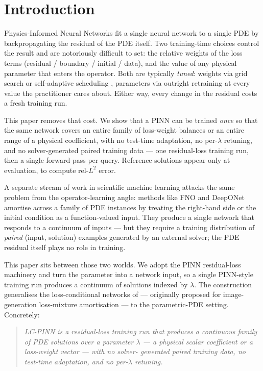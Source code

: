 \section{Introduction}
\label{sec:intro}

Physics-Informed Neural Networks \citep[PINNs;][]{raissi2019} fit a
single neural network to a single PDE by backpropagating the residual
of the PDE itself. Two training-time choices control the result and
are notoriously difficult to set: the relative weights of the loss
terms (residual / boundary / initial / data), and the value of any
physical parameter that enters the operator. Both are typically
\emph{tuned}: weights via grid search or self-adaptive scheduling
\citep{mcclenny2020,bischof2021,wang2024}, parameters via outright
retraining at every value the practitioner cares about. Either way, every
change in the residual costs a fresh training run.

This paper removes that cost. We show that a PINN can be trained
\emph{once} so that the same network covers an entire family of
loss-weight balances or an entire range of a physical coefficient,
with no test-time adaptation, no per-$\lambda$ retuning, and no
solver-generated paired training data --- one residual-loss training
run, then a single forward pass per query. Reference solutions
appear only at evaluation, to compute rel-$L^2$ error.

A separate stream of work in scientific machine learning attacks the
same problem from the operator-learning angle: methods like FNO
\citep{li2020fno} and DeepONet \citep{lu2021deeponet} amortise across
a family of PDE instances by treating the right-hand side or the
initial condition as a function-valued input. They produce a single
network that responds to a continuum of inputs --- but they require a
training distribution of \emph{paired} (input, solution) examples
generated by an external solver; the PDE residual itself plays no
role in training.

This paper sits between those two worlds. We adopt the PINN
residual-loss machinery and turn the parameter into a network input,
so a single PINN-style training run produces a continuum of
solutions indexed by $\lambda$. The construction generalises the
loss-conditional networks of \citet{dosovitskiy2020} --- originally
proposed for image-generation loss-mixture amortisation --- to the
parametric-PDE setting. Concretely:

\begin{quote}\itshape
LC-PINN is a residual-loss training run that produces a continuous
family of PDE solutions over a parameter $\lambda$ --- a physical
scalar coefficient or a loss-weight vector --- with no solver-
generated paired training data, no test-time adaptation, and no per-$\lambda$
retuning.
\end{quote}

